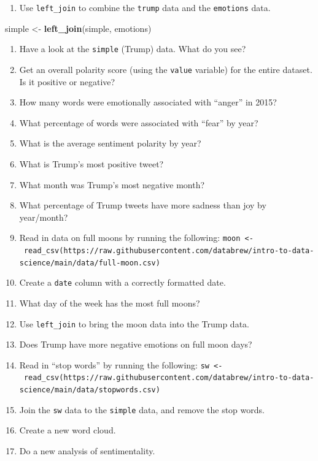 \documentclass[
]{book}
\newenvironment{Shaded}{\begin{snugshade}}{\end{snugshade}}
\newcommand{\KeywordTok}[1]{\textcolor[rgb]{0.13,0.29,0.53}{\textbf{#1}}}
\newcommand{\NormalTok}[1]{#1}
\newcommand{\StringTok}[1]{\textcolor[rgb]{0.31,0.60,0.02}{#1}}
\providecommand{\tightlist}{%
  \setlength{\itemsep}{0pt}\setlength{\parskip}{0pt}}
\begin{document}
\begin{enumerate}
\def\labelenumi{\arabic{enumi}.}
\setcounter{enumi}{20}
\tightlist
\item
  Use \texttt{left\_join} to combine the \texttt{trump} data and the \texttt{emotions} data.
\end{enumerate}

\begin{Shaded}
\begin{Highlighting}[]
\NormalTok{simple <-}\StringTok{ }\KeywordTok{left_join}\NormalTok{(simple, emotions)}
\end{Highlighting}
\end{Shaded}

\begin{enumerate}
\def\labelenumi{\arabic{enumi}.}
\setcounter{enumi}{21}
\item
  Have a look at the \texttt{simple} (Trump) data. What do you see?
\item
  Get an overall polarity score (using the \texttt{value} variable) for the entire dataset. Is it positive or negative?
\item
  How many words were emotionally associated with ``anger'' in 2015?
\item
  What percentage of words were associated with ``fear'' by year?
\item
  What is the average sentiment polarity by year?
\item
  What is Trump's most positive tweet?
\item
  What month was Trump's most negative month?
\item
  What percentage of Trump tweets have more sadness than joy by year/month?
\item
  Read in data on full moons by running the following: \texttt{moon\ \textless{}-\ read\_csv(\textquotesingle{}https://raw.githubusercontent.com/databrew/intro-to-data-science/main/data/full-moon.csv\textquotesingle{})}
\item
  Create a \texttt{date} column with a correctly formatted date.
\item
  What day of the week has the most full moons?
\item
  Use \texttt{left\_join} to bring the moon data into the Trump data.
\item
  Does Trump have more negative emotions on full moon days?
\item
  Read in ``stop words'' by running the following: \texttt{sw\ \textless{}-\ read\_csv(\textquotesingle{}https://raw.githubusercontent.com/databrew/intro-to-data-science/main/data/stopwords.csv\textquotesingle{})}
\item
  Join the \texttt{sw} data to the \texttt{simple} data, and remove the stop words.
\item
  Create a new word cloud.
\item
  Do a new analysis of sentimentality.
\end{enumerate}
\end{document}
